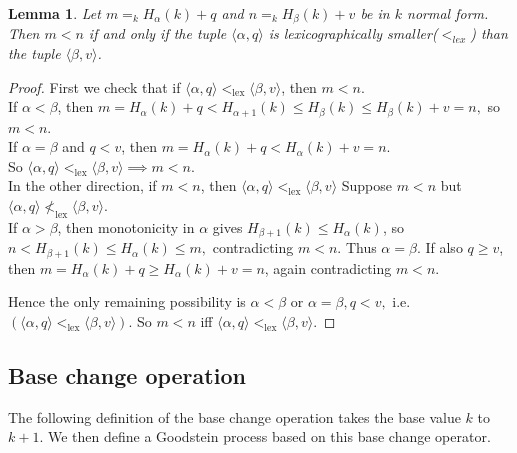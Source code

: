 \documentclass{amsart}
\theoremstyle{plain}
\theoremstyle{plain}
\newtheorem{lemma}[theorem]{Lemma}
\newcommand{\lex}{\mathrm{lex}}
\newcommand{\al}{{\alpha}}
\newcommand{\be}{{\beta}}
\begin{document}
\begin{lemma}\label{lm:lex}
Let $m=_{k}H_\al(k)+ q$  and  $n=_{k}H_\be(k) +v$ be in $k$ normal form.
Then $m<n$ if and only if the tuple $\langle \al , q \rangle $ is lexicographically smaller($<_{lex}$) than the tuple 
$\langle \be, v \rangle$.
\end{lemma}
\begin{proof} 
First we check that if $\langle\alpha,q\rangle <_{\lex} \langle\beta,v\rangle$, then $m<n$.
\\
If $\alpha<\beta$, then $m = H_\alpha(k)+q < H_{\alpha+1}(k)\le H_\beta(k)\le H_\beta(k)+v = n,$ so $m<n.$
\\
If $\alpha=\beta$ and $q<v$, then $m = H_\alpha(k)+q < H_\alpha(k)+v = n.$
\\
So $\langle\alpha,q\rangle <_{\lex} \langle\beta,v\rangle \implies m<n.$
\\
In the other direction, if $m<n$, then $\langle\alpha,q\rangle <_{\lex} \langle\beta,v\rangle$
Suppose $m<n$ but $\langle\alpha,q\rangle \not<_{\lex} \langle\beta,v\rangle.$
\\
If $\alpha>\beta$, then monotonicity in $\alpha$ gives $H_{\beta+1}(k) \le H_\alpha(k)$, so 
$n < H_{\beta+1}(k) \le H_\alpha(k) \le m,$
contradicting $m<n.$
Thus $\alpha = \beta$. If also $q\ge v$, then $m = H_\alpha(k)+q \ge H_\alpha(k)+v = n$, again contradicting $m<n.$\medskip

Hence the only remaining possibility is $\alpha<\beta$ or $\alpha=\beta, q<v,$ i.e. $(\langle\alpha,q\rangle <_{\mathrm{lex}} \langle\beta,v\rangle).$
So $m<n$ iff $\langle\alpha,q\rangle <_{\mathrm{lex}} \langle\beta,v\rangle.$

\end{proof}


\subsection{Base change operation}\label{subsec:BaseChange}
The following definition of the base change operation takes the base value $k$ to $k+1$.
We then define a Goodstein process based on this base change operator.\medskip
\end{document}
